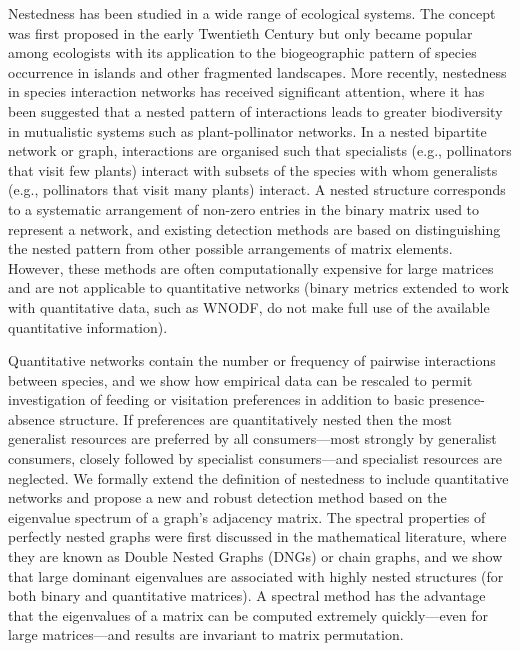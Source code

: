 \documentclass[pdftex]{nature}
\begin{document}
Nestedness has been studied in a wide range of ecological systems.
The concept was first proposed in the early Twentieth Century but only
became popular among ecologists with its application to the
biogeographic pattern of species occurrence in islands and other
fragmented landscapes\cite{Patterson_Atmar, Patterson_only}.  More
recently, nestedness in species interaction networks has received
significant
attention\cite{Discrepancy,BascompteNestedness,rezende2007,almeida2008consistent,saavedra2011},
where it has been suggested that a nested pattern of interactions
leads to greater biodiversity in mutualistic systems such as
plant-pollinator networks\cite{Bastolla2009,TFScience2010}.  In a
nested bipartite network or graph, interactions are organised such
that specialists (e.g., pollinators that visit few plants) interact
with subsets of the species with whom generalists (e.g., pollinators
that visit many plants) interact.  A nested structure corresponds to a
systematic arrangement of non-zero entries in the binary matrix used
to represent a network, and existing detection methods are based on
distinguishing the nested pattern from other possible arrangements of
matrix
elements\cite{Ulrich_Almeida-Neto_Gotelli_2009,gotelliulrich2012}.
However, these methods are often computationally expensive for large
matrices and are not applicable to quantitative networks (binary
metrics extended to work with quantitative data, such as
WNODF\cite{WNODF}, do not make full use of the available quantitative
information).

Quantitative networks contain the number or frequency of pairwise
interactions between species, and we show how empirical data can be
rescaled to permit investigation of feeding or visitation preferences
in addition to basic presence-absence structure.  If preferences are
quantitatively nested then the most generalist resources are preferred
by all consumers---most strongly by generalist consumers, closely
followed by specialist consumers---and specialist resources are
neglected.  We formally extend the definition of nestedness to include
quantitative networks and propose a new and robust detection method
based on the eigenvalue spectrum of a graph's adjacency matrix.  The
spectral properties of perfectly nested graphs were first discussed in
the mathematical literature, where they are known as Double Nested
Graphs (DNGs)\cite{andelic2011bounds} or chain
graphs\cite{bhattacharya2008first}, and we show that large dominant
eigenvalues are associated with highly nested structures (for both
binary and quantitative matrices).  A spectral method has the
advantage that the eigenvalues of a matrix can be computed extremely
quickly---even for large matrices---and results are invariant to
matrix permutation\cite{SpectralGraphTheory}.
\end{document}
